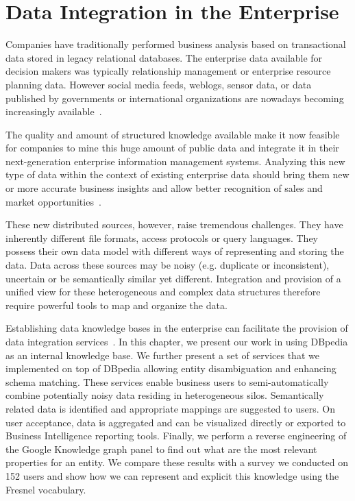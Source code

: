 \chapter{Data Integration in the Enterprise}\label{chapter:rubix}
\graphicspath{{Part2/Chapter1/figures/}}

Companies have traditionally performed business analysis based on transactional data stored in legacy relational databases. The enterprise data available for decision makers was typically relationship management or enterprise resource planning data. However social media feeds, weblogs, sensor data, or data published by governments or international organizations are nowadays becoming increasingly available~\cite{Boyd:Article:11}.

The quality and amount of structured knowledge available make it now feasible for companies to mine this huge amount of public data and integrate it in their next-generation enterprise information management systems. Analyzing this new type of data within the context of existing enterprise data should bring them new or more accurate business insights and allow better recognition of sales and market opportunities~\cite{LaValle:MIT:11}.

These new distributed sources, however, raise tremendous challenges. They have inherently different file formats, access protocols or query languages. They possess their own data model with different ways of representing and storing the data. Data across these sources may be noisy (e.g. duplicate or inconsistent), uncertain or be semantically similar yet different. Integration and provision of a unified view for these heterogeneous and complex data structures therefore require powerful tools to map and organize the data.

Establishing data knowledge bases in the enterprise can facilitate the provision of data integration services~\cite{Frischmuth:SemWebJorunal:12}. In this chapter, we present our work in using DBpedia as an internal knowledge base. We further present a set of services that we implemented on top of DBpedia allowing entity disambiguation and enhancing schema matching. These services enable business users to semi-automatically combine potentially noisy data residing in heterogeneous silos. Semantically related data is identified and appropriate mappings are suggested to users. On user acceptance, data is aggregated and can be visualized directly or exported to Business Intelligence reporting tools. Finally, we perform a reverse engineering of the Google Knowledge graph panel to find out what are the most relevant properties for an entity. We compare these results with a survey we conducted on 152 users and show how we can represent and explicit this knowledge using the Fresnel vocabulary.

